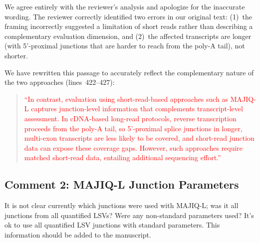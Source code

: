 \documentclass[11pt]{article}
\begin{document}
\begin{responseboxnew}
We agree entirely with the reviewer's analysis and apologize for the inaccurate wording. The reviewer correctly identified two errors in our original text: (1)~the framing incorrectly suggested a limitation of short reads rather than describing a complementary evaluation dimension, and (2)~the affected transcripts are longer (with 5'-proximal junctions that are harder to reach from the poly-A tail), not shorter.

We have rewritten this passage to accurately reflect the complementary nature of the two approaches (lines~422--427):

\begin{quote}
\textcolor{red}{``In contrast, evaluation using short-read-based approaches such as MAJIQ-L captures junction-level information that complements transcript-level assessment. In cDNA-based long-read protocols, reverse transcription proceeds from the poly-A tail, so 5'-proximal splice junctions in longer, multi-exon transcripts are less likely to be covered, and short-read junction data can expose these coverage gaps. However, such approaches require matched short-read data, entailing additional sequencing effort.''}
\end{quote}
\end{responseboxnew}

\subsection{Comment 2: MAJIQ-L Junction Parameters}

\begin{reviewercomment}
It is not clear currently which junctions were used with MAJIQ-L; was it all junctions from all quantified LSVs? Were any non-standard parameters used? It's ok to use all quantified LSV junctions with standard parameters. This information should be added to the manuscript.
\end{reviewercomment}
\end{document}
